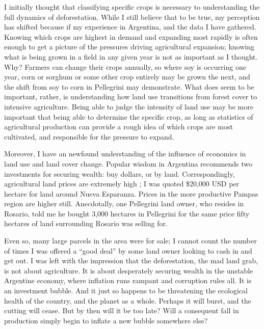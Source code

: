 I initially thought that classifying specific crops is necessary to understanding the full dynamics of deforestation. While I still believe that to be true, my perception has shifted because if my experience in Argentina, and the data I have gathered. Knowing which crops are highest in demand and expanding most rapidly is often enough to get a picture of the pressures driving agricultural expansion; knowing what is being grown in a field in any given year is not as important as I thought. Why? Farmers can change their crops annually, so where soy is occurring one year, corn or sorghum or some other crop entirely may be grown the next, and the shift from soy to corn in Pellegrini may demonstrate. What does seem to be important, rather, is understanding how land use transitions from forest cover to intensive agriculture. Being able to judge the intensity of land use may be more important that being able to determine the specific crop, as long as statistics of agricultural production can provide a rough idea of which crops are most cultivated, and responsible for the pressure to expand.

Moreover, I have an newfound understanding of the influence of economics in land use and land cover change. Popular wisdom in Argentina recommends two investments for securing wealth: buy dollars, or by land. Correspondingly, agricultural land prices are extremely high \autocite{mercopress2010prime}; I was quoted \$20,000 USD per hectare for land around Nueva Esparanza. Prices in the more productive Pampas region are higher still. Anecdotally, one Pellegrini land owner, who resides in Rosario, told me he bought 3,000 hectares in Pellegrini for the same price fifty hectares of land surrounding Rosario was selling for.

Even so, many large parcels in the area were for sale; I cannot count the number of times I was offered a ``good deal'' by some land owner looking to cash in and get out. I was left with the impression that the deforestation, the mad land grab, is not about agriculture. It is about desperately securing wealth in the unstable Argentine economy, where inflation runs rampant and corruption rules all. It is an investment bubble. And it just so happens to be threatening the ecological health of the country, and the planet as a whole. Perhaps it will burst, and the cutting will cease. But by then will it be too late? Will a consequent fall in production simply begin to inflate a new bubble somewhere else?











